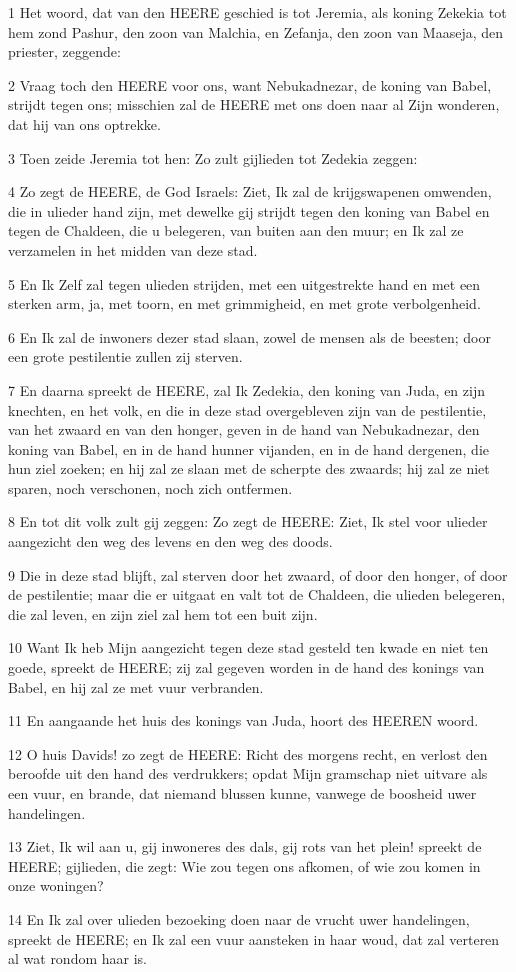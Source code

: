 \par 1 Het woord, dat van den HEERE geschied is tot Jeremia, als koning Zekekia tot hem zond Pashur, den zoon van Malchia, en Zefanja, den zoon van Maaseja, den priester, zeggende:
\par 2 Vraag toch den HEERE voor ons, want Nebukadnezar, de koning van Babel, strijdt tegen ons; misschien zal de HEERE met ons doen naar al Zijn wonderen, dat hij van ons optrekke.
\par 3 Toen zeide Jeremia tot hen: Zo zult gijlieden tot Zedekia zeggen:
\par 4 Zo zegt de HEERE, de God Israels: Ziet, Ik zal de krijgswapenen omwenden, die in ulieder hand zijn, met dewelke gij strijdt tegen den koning van Babel en tegen de Chaldeen, die u belegeren, van buiten aan den muur; en Ik zal ze verzamelen in het midden van deze stad.
\par 5 En Ik Zelf zal tegen ulieden strijden, met een uitgestrekte hand en met een sterken arm, ja, met toorn, en met grimmigheid, en met grote verbolgenheid.
\par 6 En Ik zal de inwoners dezer stad slaan, zowel de mensen als de beesten; door een grote pestilentie zullen zij sterven.
\par 7 En daarna spreekt de HEERE, zal Ik Zedekia, den koning van Juda, en zijn knechten, en het volk, en die in deze stad overgebleven zijn van de pestilentie, van het zwaard en van den honger, geven in de hand van Nebukadnezar, den koning van Babel, en in de hand hunner vijanden, en in de hand dergenen, die hun ziel zoeken; en hij zal ze slaan met de scherpte des zwaards; hij zal ze niet sparen, noch verschonen, noch zich ontfermen.
\par 8 En tot dit volk zult gij zeggen: Zo zegt de HEERE: Ziet, Ik stel voor ulieder aangezicht den weg des levens en den weg des doods.
\par 9 Die in deze stad blijft, zal sterven door het zwaard, of door den honger, of door de pestilentie; maar die er uitgaat en valt tot de Chaldeen, die ulieden belegeren, die zal leven, en zijn ziel zal hem tot een buit zijn.
\par 10 Want Ik heb Mijn aangezicht tegen deze stad gesteld ten kwade en niet ten goede, spreekt de HEERE; zij zal gegeven worden in de hand des konings van Babel, en hij zal ze met vuur verbranden.
\par 11 En aangaande het huis des konings van Juda, hoort des HEEREN woord.
\par 12 O huis Davids! zo zegt de HEERE: Richt des morgens recht, en verlost den beroofde uit den hand des verdrukkers; opdat Mijn gramschap niet uitvare als een vuur, en brande, dat niemand blussen kunne, vanwege de boosheid uwer handelingen.
\par 13 Ziet, Ik wil aan u, gij inwoneres des dals, gij rots van het plein! spreekt de HEERE; gijlieden, die zegt: Wie zou tegen ons afkomen, of wie zou komen in onze woningen?
\par 14 En Ik zal over ulieden bezoeking doen naar de vrucht uwer handelingen, spreekt de HEERE; en Ik zal een vuur aansteken in haar woud, dat zal verteren al wat rondom haar is.

